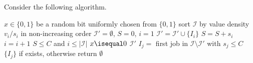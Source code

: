\documentclass[11pt]{article}
\newcommand{\Exp}{\mathbb{E}}
\begin{document}
\begin{enumerate}[leftmargin=16pt]
\begin{enumerate}[leftmargin=16pt]

            

        Consider the following algorithm.

        \begin{codebox}
            \li $x \in \{0,1\}$ be a random bit uniformly chosen from $\{0,1\}$
            \li sort $\mathcal{I}$ by value density $v_i / s_i$ in non-increasing order
            \li $\mathcal{I}' = \emptyset$, $S = 0$, $i = 1$  
            \li \Repeat
                \li $\mathcal{I}' = \mathcal{I}' \cup \{I_i\}$
                \li $S = S + s_i$ 
                \li $i = i + 1$
            \End
            \li \While $S \leq C$ and $i \leq |\mathcal{I}|$  
            \li \If $x \isequal 0$ \Then
                \li \Return $\mathcal{I}'$ 
            \li \Else
                \li $I_j =$ first job in $\mathcal{I} \setminus \mathcal{I}'$ with $s_j \leq C$
                \li \Return $\{I_j\}$ if exists, otherwise return $\emptyset$ 
        \end{codebox}


\end{enumerate}
\end{enumerate}
\end{document}
